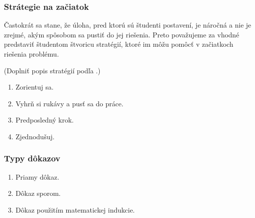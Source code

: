 {%




\subsubsection*{Strátegie na začiatok}

Častokrát sa stane, že úloha, pred ktorú sú študenti postavení, je náročná a nie je zrejmé, akým spôsobom sa pustiť do jej riešenia. Preto považujeme za vhodné predstaviť študentom štvoricu stratégií, ktoré im môžu pomôcť v začiatkoch riešenia problému.

\color{red} (Doplniť popis stratégií podľa \cite{zeitz2007}.)

\begin{enumerate}
\item Zorientuj sa.
\item Vyhrň si rukávy a pusť sa do práce.
\item Predposledný krok.
\item Zjednodušuj.
\end{enumerate}

\color{black}
\subsubsection*{Typy dôkazov}

\begin{enumerate}
\item Priamy dôkaz. 
\item Dôkaz sporom. 
\item Dôkaz použitím matematickej indukcie.
\end{enumerate}
}

